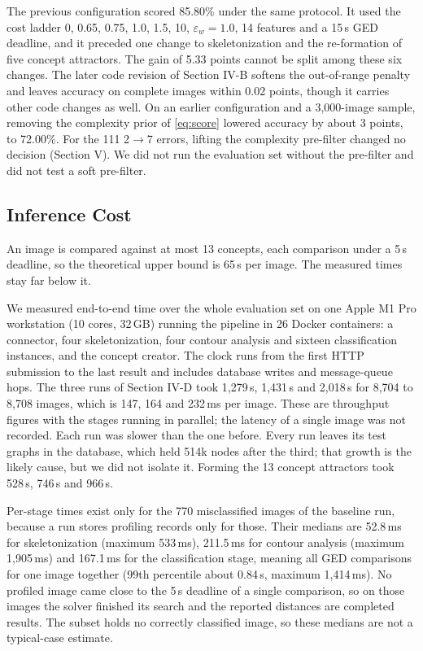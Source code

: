 The previous configuration scored 85.80\% under the same protocol. It used
the cost ladder 0, 0.65, 0.75, 1.0, 1.5, 10, $\varepsilon_w = 1.0$, 14 features
and a 15\,s GED deadline, and it preceded one change to skeletonization and the
re-formation of five concept attractors. The gain of 5.33 points cannot be
split among these six changes. The later code revision of Section IV-B softens the out-of-range penalty and
leaves accuracy on complete images within 0.02 points, though it carries other
code changes as well. On an earlier configuration and a 3,000-image sample,
removing the complexity prior of \eqref{eq:score} lowered accuracy by about 3
points, to 72.00\%. For the 111 2$\rightarrow$7 errors, lifting the complexity
pre-filter changed no decision (Section V). We did not run the evaluation set
without the pre-filter and did not test a soft pre-filter.

\subsection{Inference Cost}

An image is compared against at most 13 concepts, each comparison under a
5\,s deadline, so the theoretical upper bound is 65\,s per image. The measured
times stay far below it.

We measured end-to-end time over the whole evaluation set on one Apple M1 Pro
workstation (10 cores, 32\,GB) running the pipeline in 26 Docker containers: a
connector, four skeletonization, four contour analysis and sixteen
classification instances, and the concept creator. The clock runs from the
first HTTP submission to the last result and includes database writes and
message-queue hops. The three runs of Section IV-D took 1,279\,s, 1,431\,s and
2,018\,s for 8,704 to 8,708 images, which is 147, 164 and 232\,ms per image.
These are throughput figures with the stages running in parallel; the latency
of a single image was not recorded. Each run was slower than the one before.
Every run leaves its test graphs in the database, which held 514k nodes after
the third; that growth is the likely cause, but we did not isolate it. Forming
the 13 concept attractors took 528\,s, 746\,s and 966\,s.

Per-stage times exist only for the 770 misclassified images of the baseline
run, because a run stores profiling records only for those. Their medians are
52.8\,ms for skeletonization (maximum 533\,ms), 211.5\,ms for contour analysis
(maximum 1,905\,ms) and 167.1\,ms for the classification stage, meaning all GED
comparisons for one image together (99th percentile about 0.84\,s, maximum
1,414\,ms). No profiled image came close to the 5\,s deadline of a single
comparison, so on those images the solver finished its search and the reported
distances are completed results. The subset holds no correctly classified
image, so these medians are not a typical-case estimate.

